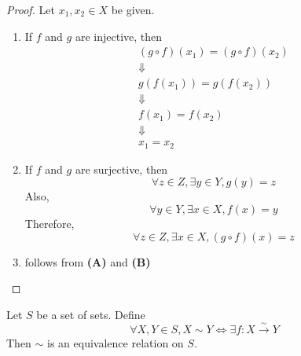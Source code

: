 \begin{proof}
    Let $x_{1}, x_{2} \in X$ be given.
    \begin{enumerate}[label=\textbf{(\Alph*)}]
        \item If $f$ and $g$ are injective, then
        \[
        \begin{array}{c}
            (g \circ f)(x_{1}) = (g \circ f)(x_{2}) \\
            \Downarrow \\
            g(f(x_{1})) = g(f(x_{2})) \\
            \Downarrow \\
            f(x_{1}) = f(x_{2}) \\
            \Downarrow \\
            x_{1} = x_{2}
        \end{array}
        \]
        \item If $f$ and $g$ are surjective, then
        \[
        \forall z \in Z, \exists y \in Y, g(y) = z
        \]
        Also,
        \[
        \forall y \in Y, \exists x \in X, f(x) = y
        \]
        Therefore,
        \[
        \forall z \in Z, \exists x \in X, (g \circ f)(x) = z
        \]
        \item follows from \textbf{(A)} and \textbf{(B)}
    \end{enumerate}
\end{proof}

\begin{theorem} \label{an:thm:bijection-equivalence-relation}
    Let $S$ be a set of sets. Define
    \[
    \forall X, Y \in S, X \sim Y \iff \exists f: X \xrightarrow{\sim} Y
    \]
    Then $\sim$ is an equivalence relation on $S$.
\end{theorem}

